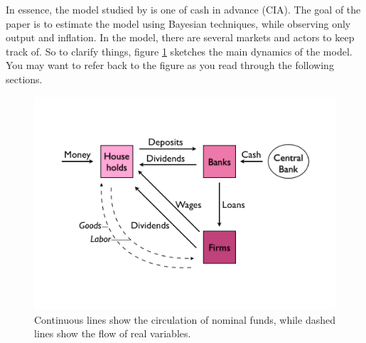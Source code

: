In essence, the model studied by \citet{Schorfheide2000} is one of cash in advance (CIA). The goal of the paper is to estimate the model using Bayesian techniques, while observing only output and inflation. In the model, there are several markets and actors to keep track of. So to clarify things, figure \ref{fig:schorfmod} sketches the main dynamics of the model. You may want to refer back to the figure as you read through the following sections. 
\begin{figure} \label{fig:schorfmod}
\begin{center} 
\includegraphics[width=1.0\textwidth]{P_SchorfMod} 
\end{center} 
\caption[CIA model illustration]{Continuous lines show the circulation of nominal funds, while dashed lines show the flow of real variables.} 
\end{figure}\\

